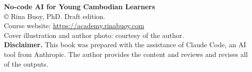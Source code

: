 \clearpage
\thispagestyle{empty}
\null\vfill
{\small\noindent\textbf{No-code AI for Young Cambodian Learners}\\ \copyright{} Rina Buoy, PhD. Draft edition.\\ Course website: \url{https://academy.rinabuoy.com}\\ Cover illustration and author photo: courtesy of the author.\\[6pt]
\textbf{Disclaimer.} This book was prepared with the assistance of Claude Code, an AI tool from Anthropic. The author provides the content and reviews and revises all of the outputs.}
\clearpage
